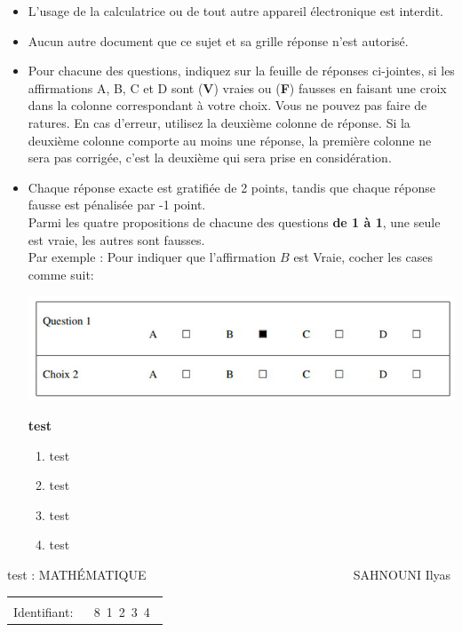 \documentclass{book}%
\begin{document}
\begin{itemize}%
\item%
L'usage de la calculatrice ou de tout autre appareil électronique est interdit.%
\item%
Aucun autre document que ce sujet et sa grille réponse n'est autorisé.%
\item%
Pour chacune des questions, indiquez sur la feuille de réponses ci-jointes, si les affirmations A, B, C et D sont (\textbf{V}) vraies ou (\textbf{F}) fausses en faisant une croix dans la colonne correspondant à votre choix. Vous ne pouvez pas faire de ratures. En cas d'erreur, utilisez la deuxième colonne de réponse. Si la deuxième colonne comporte au moins une réponse, la première colonne ne sera pas corrigée, c'est la deuxième qui sera prise en considération.%
\item%
Chaque réponse exacte est gratifiée de 2 points, tandis que chaque réponse fausse est pénalisée par -1 point. \\ 	Parmi les quatre propositions de chacune des questions \textbf{de 1 à 1}, une seule est vraie, les autres sont fausses. \\ 	Par exemple : Pour indiquer que l'affirmation $B$ est Vraie, cocher les cases comme suit:  \\ \begin{center}	\includegraphics[scale=0.8]{reponses.png} \end{center}%
\thispagestyle{empty}%
\begin{exercise}%
\textbf{test }%
\begin{enumerate}[label=\textbf{\Alph*. }]%
\item%
test%
\item%
test%
\item%
test%
\item%
test%
\end{enumerate}%
\end{exercise}%
\end{itemize}%
\newpage%
\thispagestyle{empty}%
test : MATHÉMATIQUE $\qquad \qquad \qquad \qquad \qquad \qquad \qquad \qquad$ SAHNOUNI Ilyas%
\begin{flushright}%
\begin{tabular}{|l|}%
\hline%
 \\%
\thispagestyle{empty}%
Identifiant: $\quad$ {\Large 8~1~2~3~4~}%
 \\%
\hline%
\end{tabular}%
\end{flushright}%
\end{document}
